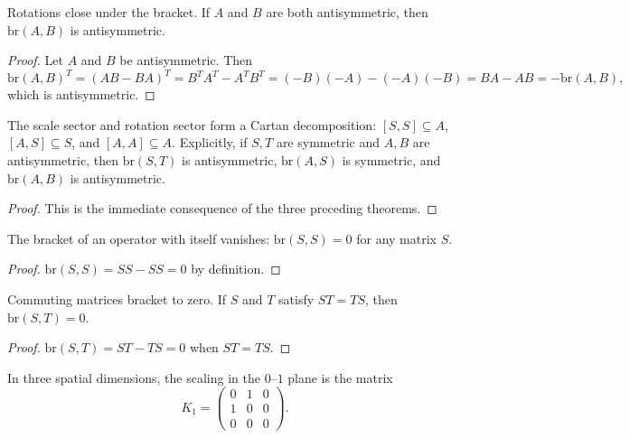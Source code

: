 \begin{theorem}
Rotations close under the bracket. If $A$ and $B$ are both antisymmetric, then $\text{br}(A, B)$ is antisymmetric.
\end{theorem}
\begin{proof}
Let $A$ and $B$ be antisymmetric. Then
\[\text{br}(A, B)^T = (AB - BA)^T = B^T A^T - A^T B^T = (-B)(-A) - (-A)(-B) = BA - AB = -\text{br}(A, B),\]
which is antisymmetric.
\end{proof}

\begin{theorem}
The scale sector and rotation sector form a Cartan decomposition: $[S, S] \subseteq A$,
$[A, S] \subseteq S$, and $[A, A] \subseteq A$. Explicitly, if $S, T$ are symmetric and
$A, B$ are antisymmetric, then $\text{br}(S, T)$ is antisymmetric, $\text{br}(A, S)$ is symmetric, and $\text{br}(A, B)$ is antisymmetric.
\end{theorem}
\begin{proof}
This is the immediate consequence of the three preceding theorems.
\end{proof}

\begin{theorem}
The bracket of an operator with itself vanishes: $\text{br}(S, S) = 0$ for any matrix $S$.
\end{theorem}
\begin{proof}
$\text{br}(S, S) = SS - SS = 0$ by definition.
\end{proof}

\begin{theorem}
Commuting matrices bracket to zero. If $S$ and $T$ satisfy $ST = TS$, then $\text{br}(S, T) = 0$.
\end{theorem}
\begin{proof}
$\text{br}(S, T) = ST - TS = 0$ when $ST = TS$.
\end{proof}

\begin{definition}
In three spatial dimensions, the scaling in the $0$--$1$ plane is the matrix
\[K_1 = \begin{pmatrix} 0 & 1 & 0 \\ 1 & 0 & 0 \\ 0 & 0 & 0 \end{pmatrix}.\]
\end{definition}

